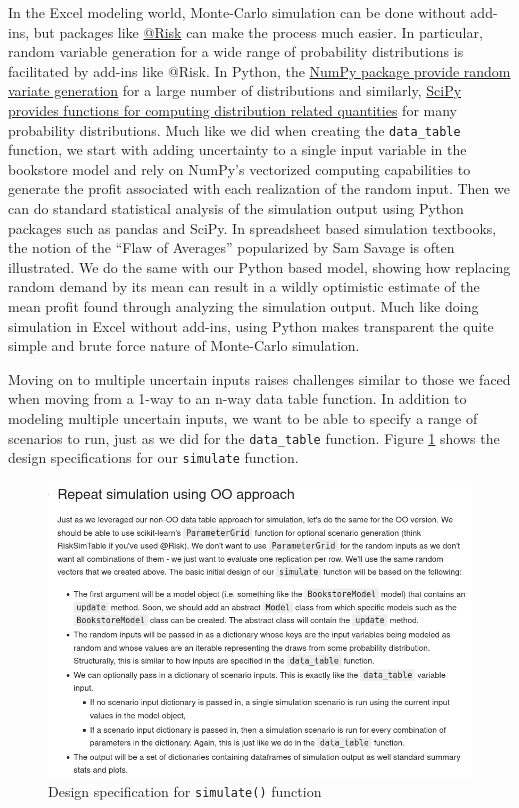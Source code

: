 \documentclass[ited,blindrev]{informs3}              %
\newcommand{\code}[1]{\texttt{#1}}
\begin{document}
In the Excel modeling world, Monte-Carlo simulation can be done without add-ins, but packages like \href{https://lumivero.com/products/at-risk/}{@Risk} can make the process much easier. In particular, random variable generation for a wide range of probability distributions is facilitated by add-ins like @Risk. In Python, the \href{https://numpy.org/doc/stable/reference/random/generator.html}{NumPy package provide random variate generation} for a large number of distributions and similarly, \href{https://docs.scipy.org/doc/scipy/reference/stats.html}{SciPy provides functions for computing distribution related quantities} for many probability distributions. Much like we did when creating the \code{data\_table} function, we start with adding uncertainty to a single input variable in the bookstore model and rely on NumPy's vectorized computing capabilities to generate the profit associated with each realization of the random input. Then we can do standard statistical analysis of the simulation output using Python packages such as pandas and SciPy. In spreadsheet based simulation textbooks, the notion of the ``Flaw of Averages'' popularized by Sam Savage \cite{savageFlawAveragesWhy2012} is often illustrated. We do the same with our Python based model, showing how replacing random demand by its mean can result in a wildly optimistic estimate of the mean profit found through analyzing the simulation output. Much like doing simulation in Excel without add-ins, using Python makes transparent the quite simple and brute force nature of Monte-Carlo simulation.

Moving on to multiple uncertain inputs raises challenges similar to those we faced when moving from a 1-way to an n-way data table function. In addition to modeling multiple uncertain inputs, we want to be able to specify a range of scenarios to run, just as we did for the \code{data\_table} function. Figure \ref{fig:oo_sim_design_specs} shows the design specifications for our \code{simulate} function.

\begin{figure}[!htbp]
\centering
\includegraphics[scale=0.5]{oo_sim_design_specs}
\caption{Design specification for \code{simulate()} function}
\label{fig:oo_sim_design_specs}
\end{figure}
\end{document}
